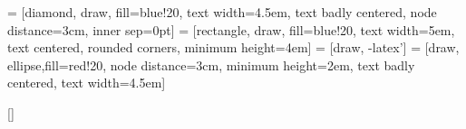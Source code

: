 \usepackage{chngcntr}

\usepackage{graphicx}
\usepackage{caption}
\usepackage{subcaption}
\usepackage{pgfplots}
\usepackage{tikz}
\usepackage{circuitikz}
\usetikzlibrary{shapes,arrows}
\pgfplotsset{compat=1.15}

\usetikzlibrary{shapes,arrows}
 = [diamond, draw, fill=blue!20, 
    text width=4.5em, text badly centered, node distance=3cm, inner sep=0pt]
 = [rectangle, draw, fill=blue!20, 
    text width=5em, text centered, rounded corners, minimum height=4em]
 = [draw, -latex']
 = [draw, ellipse,fill=red!20, node distance=3cm,
    minimum height=2em, text badly centered, text width=4.5em]
    
\usepackage[toc]{appendix}

\usepackage[style=numeric]{biblatex}
\usepackage{csquotes}
\usepackage{hyperref}


\DeclareCiteCommand{\supercite}[\mkbibsuperscript]
  {}
  {%
   \bibopenbracket{}}
  {\supercitedelim}
  {\bibclosebracket}

\usepackage{nameref}

\usepackage[acronym, nogroupskip]{glossaries}
\usepackage[intoc]{nomencl}
\renewcommand*\nompreamble{\begin{multicols}{2}}
\renewcommand*\nompostamble{\end{multicols}}
\makeglossaries
\makenomenclature
{}
